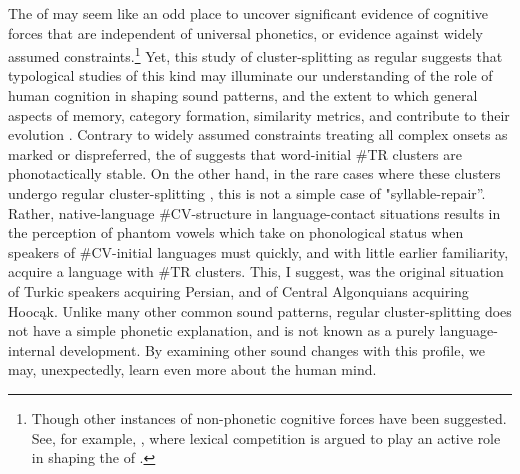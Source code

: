 \documentclass[output=paper,
modfonts
]{LSP/langsci}
\begin{document}
The  of  may seem like an odd place to uncover
significant evidence of cognitive forces that are independent of
universal phonetics, or evidence against widely assumed 
constraints.\footnote{Though other instances of non-phonetic cognitive
  forces have been suggested. See, for example, \citet{blevins2009b}, where lexical competition is argued to play an active role in
  shaping the  of .} Yet, this study of
cluster-splitting  as regular  suggests that
typological studies of this kind may illuminate our understanding of the
role of human cognition in shaping sound patterns, and the extent to
which general aspects of memory, category formation, similarity metrics,
and  contribute to their evolution \citep{blevinsblevins2009a}.
Contrary to widely assumed  constraints treating all complex
onsets as marked or dispreferred, the  of  suggests
that word-initial \#TR clusters are phonotactically stable. On the other
hand, in the rare cases where these clusters undergo regular
cluster-splitting , this  is not a simple case of
"syllable-repair”. Rather, native-language \#CV-structure in
language-contact situations results in the perception of phantom vowels
which take on phonological status when speakers of \#CV-initial
languages must quickly, and with little earlier familiarity, acquire a
language with \#TR clusters. This, I suggest, was the original situation
of Turkic speakers acquiring Persian, and of Central Algonquians
acquiring Hoocąk. Unlike many other common sound patterns, regular
cluster-splitting  does not have a simple phonetic
explanation, and is not known as a purely language-internal development.
By examining other sound changes with this profile, we may,
unexpectedly, learn even more about the human mind.


{\sloppy
\printbibliography[heading=subbibliography,notkeyword=this]
}
\end{document}
